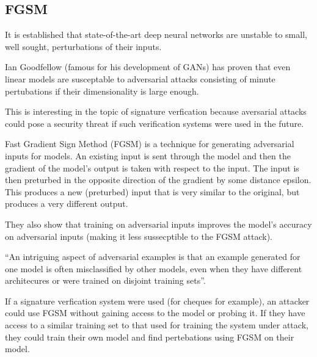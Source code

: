 \subsection{FGSM}

It is established that state-of-the-art deep neural networks are unstable to small, well sought, perturbations of their inputs\cite{deep_fool}.

Ian Goodfellow (famous for his development of GANs) has proven that even linear models are susceptable to adversarial attacks consisting of minute pertubations if their dimensionality is large enough\cite{goodfellow}.

This is interesting in the topic of signature verfication because aversarial attacks could pose a security threat if such verification systems were used in the future.

Fast Gradient Sign Method (FGSM) is a technique for generating adversarial inputs for models.
An existing input is sent through the model and then the gradient of the model's output is taken with respect to the input.
The input is then preturbed in the opposite direction of the gradient by some distance epsilon.
This produces a new (preturbed) input that is very similar to the original, but produces a very different output.

They also show that training on adversarial inputs improves the model's accuracy on adversarial inputs (making it less sussecptible to the FGSM attack).

``An intriguing aspect of adversarial examples is that an example generated for one model is often
misclassified by other models, even when they have different architecures or were trained on disjoint training sets''\cite{goodfellow}.

If a signature verfication system were used (for cheques for example), an attacker could use FGSM without gaining access to the model or probing it.
If they have access to a similar training set to that used for training the system under attack, they could train their own model and find pertebations using FGSM on their model.


